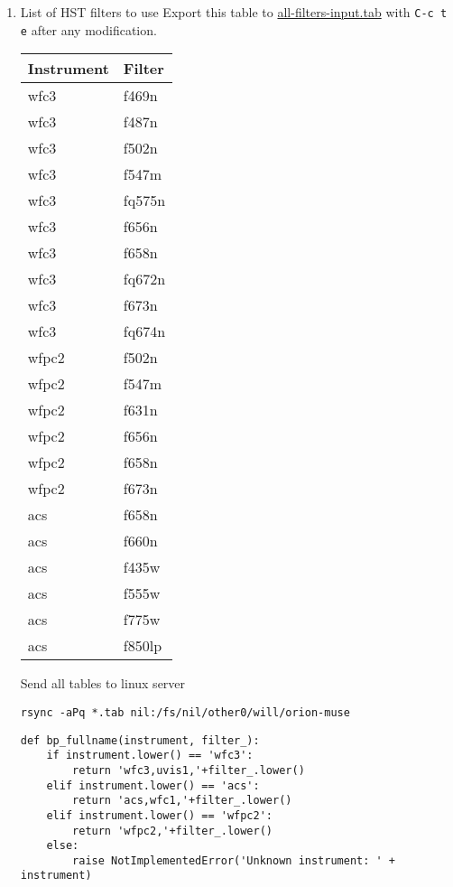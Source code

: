 \documentclass[11pt]{article}
\begin{document}
\begin{enumerate}
\item List of HST filters to use
\label{sec:orgheadline16}
Export this table to \url{all-filters-input.tab} with \texttt{C-c t e} after any modification. 

\begin{center}
\label{tab:orgtable1}

\begin{tabular}{ll}
Instrument & Filter\\
\hline
wfc3 & f469n\\
wfc3 & f487n\\
wfc3 & f502n\\
wfc3 & f547m\\
wfc3 & fq575n\\
wfc3 & f656n\\
wfc3 & f658n\\
wfc3 & fq672n\\
wfc3 & f673n\\
wfc3 & fq674n\\
\hline
wfpc2 & f502n\\
wfpc2 & f547m\\
wfpc2 & f631n\\
wfpc2 & f656n\\
wfpc2 & f658n\\
wfpc2 & f673n\\
\hline
acs & f658n\\
acs & f660n\\
acs & f435w\\
acs & f555w\\
acs & f775w\\
acs & f850lp\\
\end{tabular}
\end{center}


Send all tables to linux server
\begin{verbatim}
rsync -aPq *.tab nil:/fs/nil/other0/will/orion-muse
\end{verbatim}

\begin{verbatim}
def bp_fullname(instrument, filter_):
    if instrument.lower() == 'wfc3':
        return 'wfc3,uvis1,'+filter_.lower()
    elif instrument.lower() == 'acs':
        return 'acs,wfc1,'+filter_.lower()
    elif instrument.lower() == 'wfpc2':
        return 'wfpc2,'+filter_.lower()
    else:
        raise NotImplementedError('Unknown instrument: ' + instrument)
\end{verbatim}



\end{enumerate}
\end{document}
